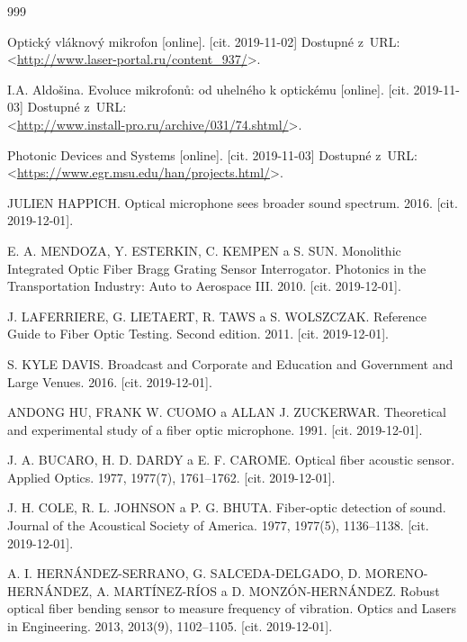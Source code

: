 

\begin{thebibliography}{999}
	


	Optický vláknový mikrofon [online]. [cit. 2019-11-02] Dostupné z~URL:\\ 
	<\url{http://www.laser-portal.ru/content_937/}>.
	
	I.A. Aldošina. Evoluce	mikrofonů: od uhelného k optickému [online]. [cit. 2019-11-03] Dostupné z~URL:\\ 
<\url{http://www.install-pro.ru/archive/031/74.shtml/}>.
		
	Photonic Devices and Systems [online]. [cit. 2019-11-03] Dostupné z~URL:\\ 
<\url{https://www.egr.msu.edu/han/projects.html/}>.

	JULIEN HAPPICH. Optical microphone sees broader sound spectrum. 2016. [cit. 2019-12-01].

	E. A. MENDOZA, Y. ESTERKIN, C. KEMPEN a S. SUN. Monolithic Integrated Optic Fiber Bragg Grating Sensor Interrogator. Photonics in the Transportation Industry: Auto to Aerospace III. 2010. [cit. 2019-12-01].

	J. LAFERRIERE, G. LIETAERT, R. TAWS a S. WOLSZCZAK. Reference Guide to Fiber Optic Testing. Second edition. 2011. [cit. 2019-12-01].
	
	S. KYLE DAVIS. Broadcast and Corporate and Education and Government and Large Venues. 2016. [cit. 2019-12-01].
	
	ANDONG HU, FRANK W. CUOMO a ALLAN J. ZUCKERWAR. Theoretical and experimental study of a fiber optic microphone. 1991. [cit. 2019-12-01].
	
	J. A. BUCARO, H. D. DARDY a E. F. CAROME. Optical fiber acoustic sensor. Applied Optics. 1977, 1977(7), 1761–1762. [cit. 2019-12-01].

	J. H. COLE, R. L. JOHNSON a P. G. BHUTA. Fiber-optic detection of sound. Journal of the Acoustical Society of America. 1977, 1977(5), 1136–1138. [cit. 2019-12-01].

	A. I. HERNÁNDEZ-SERRANO, G. SALCEDA-DELGADO, D. MORENO-HERNÁNDEZ, A. MARTÍNEZ-RÍOS a D. MONZÓN-HERNÁNDEZ. Robust optical fiber bending sensor to measure frequency of vibration. Optics and Lasers in Engineering. 2013, 2013(9), 1102–1105. [cit. 2019-12-01].


\end{thebibliography}
